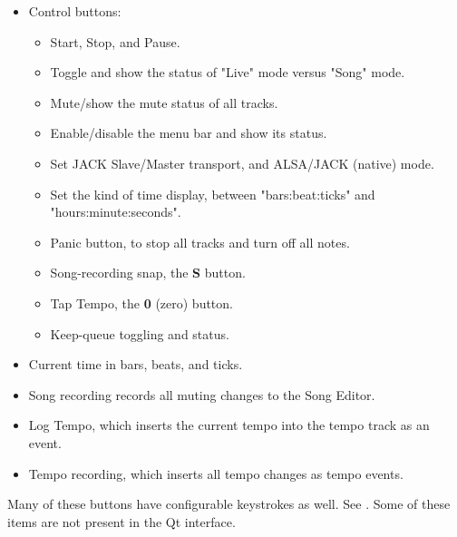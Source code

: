 \documentclass[
 11pt,
 twoside,
 a4paper,
 headinclude,
 footinclude,
 final                                 %
]{article}
\begin{document}
   \begin{itemize}
      \item Control buttons:
      \begin{itemize}
         \item Start, Stop, and Pause.
         \item Toggle and show the status of "Live" mode versus "Song" mode.
         \item Mute/show the mute status of all tracks.
         \item Enable/disable the menu bar and show its status.
         \item Set JACK Slave/Master transport, and
            ALSA/JACK (native) mode.
         \item Set the kind of time display, between "bars:beat:ticks"
            and "hours:minute:seconds".
         \item Panic button, to stop all tracks and turn off all notes.
         \item Song-recording snap, the \textbf{S} button.
         \item Tap Tempo, the \textbf{0} (zero) button.
         \item Keep-queue toggling and status.
      \end{itemize}
      \item Current time in bars, beats, and ticks.
      \item Song recording records all muting changes to the Song Editor.
      \item Log Tempo, which inserts the current tempo into the tempo track
         as an event.
      \item Tempo recording, which inserts all tempo changes as tempo events.
   \end{itemize}

   Many of these buttons have configurable keystrokes as well.
   See .
   Some of these items are not present in the Qt interface.

\rhead{\rightmark}         %










\end{document}

